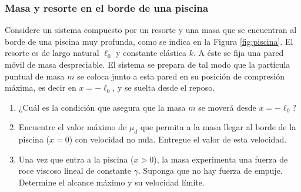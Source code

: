\subsubsection{Masa y resorte en el borde de una piscina}

Considere un sistema compuesto por un resorte y una masa que se encuentran al borde de una piscina muy profunda, como se indica en la Figura \ref{fig:piscina}. El resorte es de largo natural $\ell_0$ y constante elástica $k$. A éste se fija una pared móvil de masa despreciable. El sistema se prepara de tal modo que la partícula puntual de masa $m$ se coloca junto a esta pared en su posición de compresión máxima, es decir en $x = -\ell_0$, y se suelta desde el reposo.

\begin{enumerate}
    \item ¿Cuál es la condición que asegura que la masa $m$ se moverá desde $x = -\ell_0$?
    \item Encuentre el valor máximo de $\mu_d$ que permita a la masa llegar al borde de la piscina ($x = 0$) con velocidad no nula. Entregue el valor de esta velocidad.
    \item Una vez que entra a la piscina ($x > 0$), la masa experimenta una fuerza de roce viscoso lineal de constante $\gamma$. Suponga que no hay fuerza de empuje. Determine el alcance máximo y su velocidad límite.
\end{enumerate}

